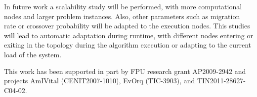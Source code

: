 In future work a scalability study will be performed, with more computational nodes and larger problem instances. Also, other parameters such as migration rate or crossover probability will be adapted to the execution nodes. This studies will lead to automatic adaptation during runtime, with different nodes entering or exiting in the topology during the algorithm execution or adapting to the current load of the system.



\begin{acknowledgements}
This work has been supported in part by FPU research grant AP2009-2942 and projects AmIVital (CENIT2007-1010), EvOrq (TIC-3903), and TIN2011-28627-C04-02.
\end{acknowledgements}


 






